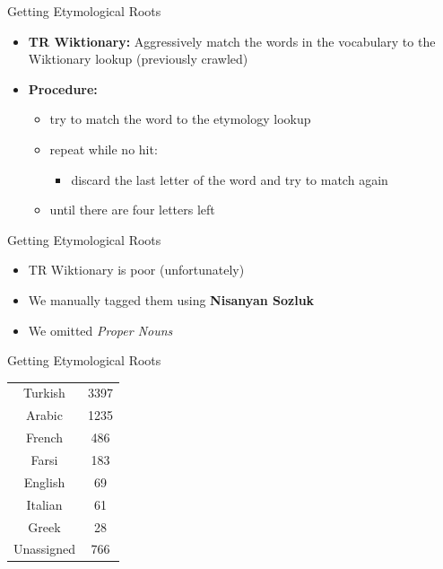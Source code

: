 \documentclass[pdf]{beamer}
\begin{document}
\begin{frame}{Getting Etymological Roots}
	
	\begin{itemize}
		\item {\bf TR Wiktionary:} Aggressively match the words in the vocabulary to the Wiktionary lookup (previously crawled)
		\item {\bf Procedure:}
		\begin{itemize}
			\item try to match the word to the etymology lookup
			\item repeat while no hit:
			\begin{itemize}
				\item discard the last letter of the word and try to match again
			\end{itemize}
			\item until there are four letters left
		\end{itemize}
	\end{itemize}
	
\end{frame}

\begin{frame}{Getting Etymological Roots}
	
	\begin{itemize}
		\item TR Wiktionary is poor (unfortunately)
		\item We manually tagged them using {\bf Nisanyan Sozluk}
		\item We omitted \textit{Proper Nouns} 
	\end{itemize}
	
\end{frame}

\begin{frame}{Getting Etymological Roots}
	
	\begin{tabular}{c|c}
		Turkish&3397\\
		Arabic&1235\\
		French&486\\
		Farsi&183\\
		English&69\\
		Italian&61\\
		Greek&28\\
		Unassigned&766\\
	\end{tabular}
	
\end{frame}
\end{document}
